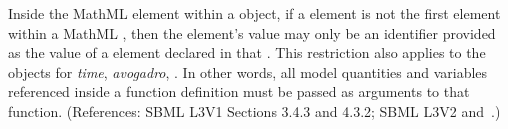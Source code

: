 Inside the  MathML element within a \FunctionDefinition
object, if a  element is not the first element within a MathML
, then the  element's value may only be an
identifier provided as the value of a  element declared in that
.  This restriction also applies to the 
objects for \emph{time}, \emph{avogadro}, .  In other words, all model
quantities and variables referenced inside a function definition must be
passed as arguments to that function.  (References: SBML L3V1 Sections 3.4.3 and 4.3.2; SBML L3V2
 and~.)
